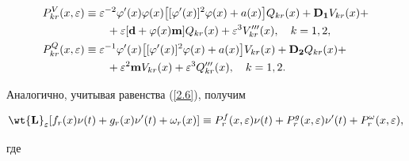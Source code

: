 \begin{align}


P_{kr}^{V} (x,\varepsilon) &\equiv \varepsilon^{-2}\varphi


'(x) \varphi (x)\big[ [\varphi' (x)]^2\varphi (x) +


a (x) \big] Q_{kr} (x) + \bold{D_1} V_{kr} (x) +\notag \\


%


\label{3.2} &\qquad + \varepsilon [\bold{d} + \varphi (x) \bold{m}]


Q_{kr} (x) + \varepsilon^3 V'''_{kr}(x), \quad k =1,2, \\


%


P_{kr}^{Q} (x,\varepsilon) &\equiv \varepsilon^{-1}\varphi' (x)


\big[[\varphi' (x)]^2 \varphi (x) + a (x) \big] V_{kr}


(x) + \bold{D_2} Q_{kr} (x) + \notag \\


%


\label{3.3} &\qquad+ \varepsilon^2 \bold{m} V_{kr} (x) + \varepsilon^3


Q'''_{kr}(x), \quad k =1,2.


\end{align}


Аналогично, учитывая равенства (\ref{2.6}), получим


\begin{equation}


\label{3.4} {\wt{\bold L}_{\varepsilon }} [ f_{r} (


{x}) \nu (t) + g_{r} (x) \nu' ({t}


) + \omega_r (x) ] \equiv P_r^{f} (x,\varepsilon)


\nu (t) + P_r^{g} (x,\varepsilon) \nu'


(t) + P_r^{\omega} (x,\varepsilon),


\end{equation}


где



